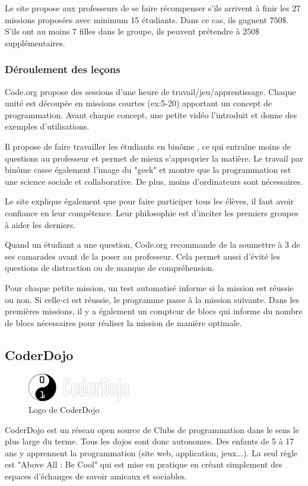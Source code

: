 Le site propose aux professeurs de se faire récompenser s'ils arrivent à finir les 27 missions proposées avec minimum 15 étudiants. Dans ce cas, ils gagnent $750\$$. S'ils ont au moins 7 filles dans le groupe, ils peuvent prétendre à $250\$$ supplémentaires.

\subsubsection{Déroulement des leçons}
Code.org propose des sessions d'une heure de travail/jeu/apprentissage. Chaque unité est découpée en missions courtes (ex:5-20) apportant un concept de programmation. Avant chaque concept, une petite vidéo l'introduit et donne des exemples d'utilisations.

Il propose de faire travailler les étudiants en binôme \cite{wiki:pair-prog}, ce qui entraîne moins de questions au professeur et permet de mieux s'approprier la matière. Le travail par binôme casse également l'image du "geek" et montre que la programmation est une science sociale et collaborative. De plus, moins d'ordinateurs sont nécessaires.

Le site explique également que pour faire participer tous les élèves, il faut avoir confiance en leur compétence. Leur philosophie est d'inciter les premiers groupes à aider les derniers.

Quand un étudiant a une question, Code.org recommande de la soumettre à 3 de ses camarades avant de la poser au professeur. Cela permet aussi d'évité les questions de distraction ou de manque de compréhension.

Pour chaque petite mission, un test automatisé informe si la mission est réussie ou non. Si celle-ci est réussie, le programme passe à la mission suivante. Dans les premières missions, il y a également un compteur de blocs qui informe du nombre de blocs nécessaires pour réaliser la mission de manière optimale.

\subsection{CoderDojo}
\begin{figure}[!h]
  \begin{center}
    \includegraphics[scale=0.5]{content/5-related_work/images/dojo}
    \caption{Logo de CoderDojo}
    \label{fig:coder dojo}
  \end{center}
\end{figure}
CoderDojo \cite{dojo-about} est un réseau open source de Clubs de programmation dans le sens le plus large du terme. Tous les dojos sont donc autonomes. Des enfants de 5 à 17 ans y apprennent la programmation (site web, application, jeux...). La seul règle est "Above All : Be Cool" qui est mise en pratique en créant simplement des espaces d'échanges de savoir amicaux et sociables.

